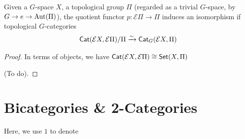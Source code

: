 \documentclass{article}
\begin{document}
\hfil

\begin{thm}
Given a $G$-space $X$, a topological group $\Pi$ (regarded as a trivial $G$-space, by $G\rightarrow e\rightarrow \mathrm{Aut}(\Pi)$), the quotient functor $p:\mathcal{E}\Pi\rightarrow\Pi$ induces an isomorphism if topological $G$-categories 
\[\mathsf{Cat}(\mathcal{E}X,\mathcal{E}\Pi)/\Pi\xrightarrow{\sim}\mathsf{Cat}_G(\mathcal{E}X,\Pi)\]
\end{thm}
\begin{proof}
    In terms of objects, we have $\mathsf{Cat}(\mathcal{E}X,\mathcal{E}\Pi)\cong \mathsf{Set}(X,\Pi)$

    (To do).
\end{proof}

\newpage

\section{Bicategories \& 2-Categories}

Here, we use $1$ to denote
\end{document}

